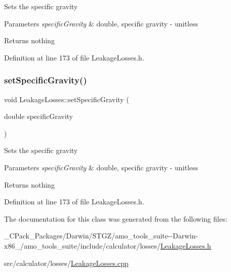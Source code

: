 Sets the specific gravity


\begin{DoxyParams}{Parameters}
{\em specific\+Gravity} & double, specific gravity -\/ unitless\\
\hline
\end{DoxyParams}
\begin{DoxyReturn}{Returns}
nothing 
\end{DoxyReturn}


Definition at line 173 of file Leakage\+Losses.\+h.

\mbox{\label{class_leakage_losses_ab017828413655c5903374564e8718fac}} 
\subsubsection{\texorpdfstring{set\+Specific\+Gravity()}{setSpecificGravity()}\hspace{0.1cm}{\footnotesize\ttfamily [3/3]}}
{\footnotesize\ttfamily void Leakage\+Losses\+::set\+Specific\+Gravity (\begin{DoxyParamCaption}\item[{double}]{specific\+Gravity }\end{DoxyParamCaption})\hspace{0.3cm}{\ttfamily [inline]}}

Sets the specific gravity


\begin{DoxyParams}{Parameters}
{\em specific\+Gravity} & double, specific gravity -\/ unitless\\
\hline
\end{DoxyParams}
\begin{DoxyReturn}{Returns}
nothing 
\end{DoxyReturn}


Definition at line 173 of file Leakage\+Losses.\+h.



The documentation for this class was generated from the following files\+:\begin{DoxyCompactItemize}
\item 
\+\_\+\+C\+Pack\+\_\+\+Packages/\+Darwin/\+S\+T\+G\+Z/amo\+\_\+tools\+\_\+suite-\/-\/\+Darwin-\/x86\+\_/amo\+\_\+tools\+\_\+suite/include/calculator/losses/\hyperlink{___c_pack___packages_2_darwin_2_s_t_g_z_2amo__tools__suite--_darwin-x86__64_2amo__tools__suite_2eff36906b0118b933544333840dbb6dd}{Leakage\+Losses.\+h}\item 
src/calculator/losses/\hyperlink{_leakage_losses_8cpp}{Leakage\+Losses.\+cpp}\end{DoxyCompactItemize}
